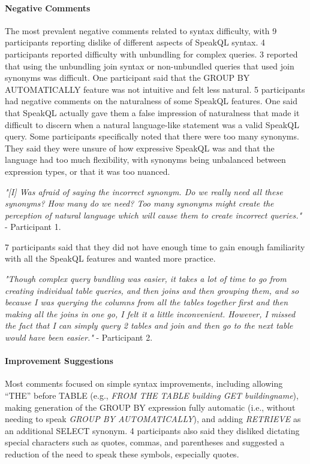 \paragraph{\textbf{Negative Comments}}
The most prevalent negative comments related to syntax difficulty, with 9 participants reporting dislike of different aspects of SpeakQL syntax. 
4 participants reported difficulty with unbundling for complex queries. 
3 reported that using the unbundling join syntax or non-unbundled queries that used join synonyms was difficult. 
One participant said that the GROUP BY AUTOMATICALLY feature was not intuitive and felt less natural.
5 participants had negative comments on the naturalness of some SpeakQL features. 
One said that SpeakQL actually gave them a false impression of naturalness that made it difficult to discern when a natural language-like statement was a valid SpeakQL query. 
Some participants specifically noted that there were too many synonyms. 
They said they were unsure of how expressive SpeakQL was and that the language had too much flexibility, with synonyms being unbalanced between expression types, or that it was too nuanced. 

\vspace{1mm}
\emph{"[I] Was afraid of saying the incorrect synonym. Do we really need all these synonyms? How many do we need? Too many synonyms might create the perception of natural language which will cause them to create incorrect queries."}
- Participant 1.

\vspace{1mm}
7 participants said that they did not have enough time to gain enough familiarity with all the SpeakQL features and  wanted more practice. 

\vspace{1mm}
\emph{"Though complex query bundling was easier, it takes a lot of time to go from creating individual table queries, and then joins and then grouping them, and so because I was querying the columns from all the tables together first and then making all the joins in one go, I felt it a little inconvenient. However, I missed the fact that I can simply query 2 tables and join and then go to the next table would have been easier."}
- Participant 2.

\paragraph{\textbf{Improvement Suggestions}} 
Most comments focused on simple syntax improvements, including allowing ``THE'' before TABLE (e.g., \emph{FROM THE TABLE building GET buildingname}), making generation of the GROUP BY expression fully automatic (i.e., without needing to speak \emph{GROUP BY AUTOMATICALLY}), and adding \emph{RETRIEVE} as an additional SELECT synonym. 
4 participants also said they disliked dictating special characters such as quotes, commas, and parentheses and suggested a reduction of the need to speak these symbols, especially quotes.


